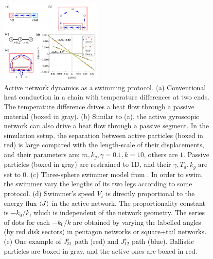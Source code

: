 \documentclass[
 preprint,
 preprintnumbers,
 amsmath,amssymb,
 aps,
 pre,
 longbibliography,
 superscriptaddress,
 10pt, twocolumn
]{revtex4-1}
\begin{document}
\begin{figure}[ht]
	\centering
	\includegraphics[width=0.45\textwidth]{7_swimmer.pdf}
    \caption{Active network dynamics as a swimming protocol.
    (a) Conventional heat conduction in a chain with temperature differences at two ends. The temperature difference drives a heat flow through a passive material (boxed in gray).
    (b) Similar to (a), the active gyroscopic network can also drive a heat flow through a passive segment. In the simulation setup, the separation between active particles (boxed in red) is large compared with the length-scale of their displacements, and their parameters are: $m,k_g,\gamma=0.1, k=10$, others are $1$. Passive particles (boxed in gray) are restrained to 1D, and their $\gamma,T_a,k_g$ are set to $0$.
    (c) Three-sphere swimmer model from \cite{Golestanian2008AnalyticResults}. In order to swim, the swimmer vary the lengths of its two legs according to some protocol.
    (d) Swimmer's speed $V_s$ is directly proportional to the energy flux $\expval{J}$ in the active network. The proportionality constant is $-k_0/k$, which is independent of the network geometry. The series of dots for each $-k_0/k$ are obtained by varying the labelled angles (by red disk sectors) in pentagon networks or square+tail networks.
    (e) One example of $J_{31}^s$ path (red) and $J_{12}^s$ path (blue). Ballistic particles are boxed in gray, and the active ones are boxed in red.
    }
    \label{fig:swimmer}
\end{figure}

\end{document}
